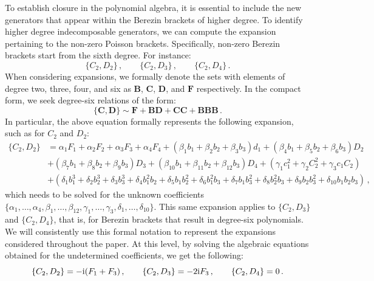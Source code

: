\documentclass[10pt]{amsart}
\theoremstyle{definition}
\theoremstyle{corollary}
\theoremstyle{remark}
\theoremstyle{conclusion}
\begin{document}
To establish closure in the polynomial algebra, it is essential to include the new generators that appear within the Berezin brackets of higher degree. To identify higher degree indecomposable generators, we can compute the expansion pertaining to the non-zero Poisson brackets. Specifically, non-zero Berezin brackets start from the sixth degree. For instance:
\begin{equation}
\{C_2, D_2\} \, ,\qquad \{C_2, D_3\} \, ,\qquad  \{C_2, D_4\} \, .
\end{equation}
When considering expansions, we formally denote the sets with elements of degree two, three, four, and six as $\mathbf{B}$, $\mathbf{C}$, $\mathbf{D}$, and $\mathbf{F}$ respectively. In the compact form, we seek degree-six relations of the form:
\begin{equation}
\{\mathbf{C}, \mathbf{D}\} \sim \mathbf{F}+\mathbf{B}\mathbf{D}+\mathbf{C}\mathbf{C}+\mathbf{B}\mathbf{B}\mathbf{B} \, .
\label{deg6}
\end{equation}
In particular, the above equation formally represents the following expansion, such as for $C_2$ and $D_2$:
\begin{equation}
\begin{split}
\{C_2, D_2\}&=\alpha_1  F_1+\alpha_2  F_2+\alpha_3  F_3+\alpha_4  F_4+(\beta_1 b_1+\beta_2 b_2+\beta_3 b_3)d_1+(\beta_4 b_1+\beta_5 b_2+\beta_6 b_3)D_2\\
&+(\beta_7 b_1+\beta_8 b_2+\beta_9 b_3)D_3 +(\beta_{10} b_1+\beta_{11} b_2+\beta_{12} b_3)D_4+(\gamma_1 c_1^2+\gamma_2 C_2^2+\gamma_3 c_1 C_2)\\
&+(\delta_1 b_1^3+\delta_2 b_2^3+\delta_3 b_3^3+\delta_4 b_1^2 b_2+ \delta_5 b_1 b_2^2+\delta_6 b_1^2 b_3+\delta_7 b_1 b_3^2+\delta_8 b_2^2 b_3+\delta_9 b_2 b_3^2+\delta_{10} b_1 b_2 b_3) \, ,
\end{split}
\end{equation}
which needs to be solved for the unknown coefficients $\{\alpha_1, \dots, \alpha_{4}, \beta_1, \dots, \beta_{12}, \gamma_1, \dots, \gamma_{3}, \delta_1, \dots, \delta_{10}\}$. This same expansion applies to $\{C_2, D_3\}$ and $\{C_2, D_4\}$, that is, for Berezin brackets that result in degree-six polynomials. We will consistently use this formal notation to represent the expansions considered throughout the paper.
 At this level, by solving the algebraic equations obtained for the undetermined coefficients, we get the following:
\begin{equation}
\{C_2, D_2\}=-{\rm i} (F_1+F_3) \, , \qquad \{C_2, D_3\}= -2 {\rm i} F_3 \, , \qquad \{C_2, D_4\}=0 \, .
\end{equation}
\end{document}

